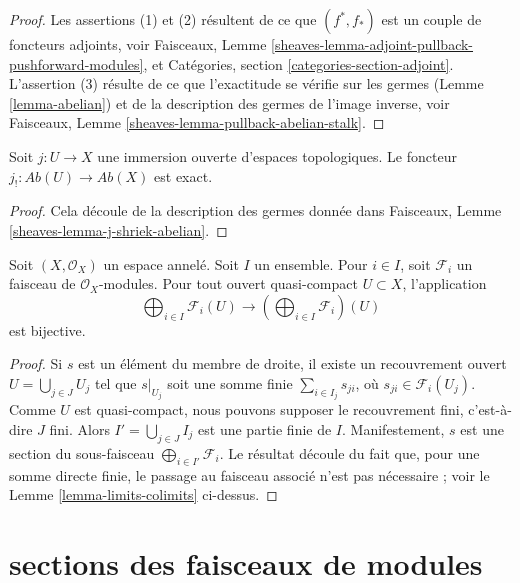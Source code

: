 \begin{proof}
Les assertions (1) et (2) résultent de ce que $(f^*, f_*)$ est un couple de
foncteurs adjoints, voir Faisceaux, Lemme
\ref{sheaves-lemma-adjoint-pullback-pushforward-modules}, et Catégories,
section \ref{categories-section-adjoint}. L'assertion (3) résulte de ce que
l'exactitude se vérifie sur les germes (Lemme \ref{lemma-abelian}) et de la
description des germes de l'image inverse, voir Faisceaux, Lemme
\ref{sheaves-lemma-pullback-abelian-stalk}.
\end{proof}

\begin{lemma}
\label{lemma-j-shriek-exact}
Soit $j : U \to X$ une immersion ouverte d'espaces topologiques. Le foncteur
$j_! : \textit{Ab}(U) \to \textit{Ab}(X)$ est exact.
\end{lemma}

\begin{proof}
Cela découle de la description des germes donnée dans Faisceaux, Lemme
\ref{sheaves-lemma-j-shriek-abelian}.
\end{proof}

\begin{lemma}
\label{lemma-section-direct-sum-quasi-compact}
Soit $(X, \mathcal{O}_X)$ un espace annelé. Soit $I$ un ensemble. Pour
$i \in I$, soit $\mathcal{F}_i$ un faisceau de $\mathcal{O}_X$-modules.
Pour tout ouvert quasi-compact $U \subset X$, l'application
$$
\bigoplus\nolimits_{i \in I} \mathcal{F}_i(U)
\longrightarrow
\left(\bigoplus\nolimits_{i \in I} \mathcal{F}_i\right)(U)
$$
est bijective.
\end{lemma}

\begin{proof}
Si $s$ est un élément du membre de droite, il existe un recouvrement ouvert
$U = \bigcup_{j \in J} U_j$ tel que $s|_{U_j}$ soit une somme finie
$\sum_{i \in I_j} s_{ji}$, où $s_{ji} \in \mathcal{F}_i(U_j)$. Comme $U$
est quasi-compact, nous pouvons supposer le recouvrement fini, c'est-à-dire
$J$ fini. Alors $I' = \bigcup_{j \in J} I_j$ est une partie finie de $I$.
Manifestement, $s$ est une section du sous-faisceau
$\bigoplus_{i \in I'} \mathcal{F}_i$. Le résultat découle du fait que, pour
une somme directe finie, le passage au faisceau associé n'est pas nécessaire ;
voir le Lemme \ref{lemma-limits-colimits} ci-dessus.
\end{proof}



\section{sections des faisceaux de modules}
\label{section-sections}

